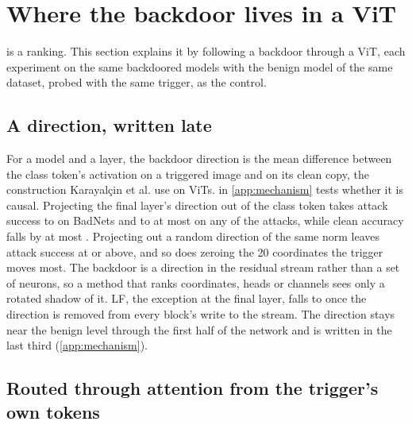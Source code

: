 \section{Where the backdoor lives in a ViT}
\label{sec:mechanism}

 is a ranking. This section explains it by following a backdoor through a ViT, each experiment on the same backdoored models with the benign model of the same dataset, probed with the same trigger, as the control.

\subsection{A direction, written late}
\label{sec:mechanism:direction}

For a model and a layer, the backdoor direction is the mean difference between the class token's activation on a triggered image and on its clean copy, the construction Karayal\c{c}in et al. use on ViTs.  in \cref{app:mechanism} tests whether it is causal. Projecting the final layer's direction out of the class token takes attack success to \AblationDirectionMinAsr{} on BadNets and to at most \AblationDirectionMaxAsr{} on any of the \AblationCheckpoints{} attacks, while clean accuracy falls by at most \AblationCleanAccuracyCost{}. Projecting out a random direction of the same norm leaves attack success at \AblationRandomDirectionMinAsr{} or above, and so does zeroing the 20 coordinates the trigger moves most. The backdoor is a direction in the residual stream rather than a set of neurons, so a method that ranks coordinates, heads or channels sees only a rotated shadow of it. LF, the exception at the final layer, falls to \ErasureLfAsrAfterAllWritesMax{} once the direction is removed from every block's write to the stream. The direction stays near the benign level through the first half of the network and is written in the last third (\cref{app:mechanism}).


\subsection{Routed through attention from the trigger's own tokens}
\label{sec:mechanism:routing}

